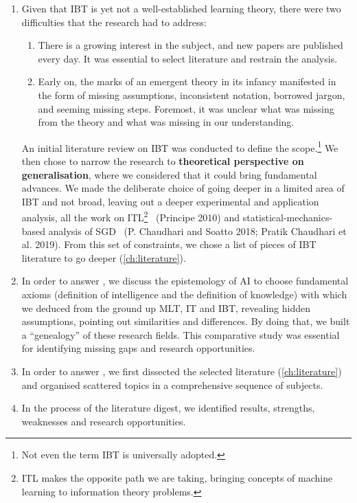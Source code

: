 \documentclass[
  letterpaper,
]{tufte-book}
\begin{document}
\begin{enumerate}
\def\labelenumi{\arabic{enumi}.}
\item
  Given that {IBT} is yet not a well-established learning theory, there
  were two difficulties that the research had to address:

  \begin{enumerate}
  \def\labelenumii{\arabic{enumii}.}
  \item
    There is a growing interest in the subject, and new papers are
    published every day. It was essential to select literature and
    restrain the analysis.
  \item
    Early on, the marks of an emergent theory in its infancy manifested
    in the form of missing assumptions, inconsistent notation, borrowed
    jargon, and seeming missing steps. Foremost, it was unclear what was
    missing from the theory and what was missing in our understanding.
  \end{enumerate}

  An initial literature review on {IBT} was conducted to define the
  scope.\footnote{Not even the term {IBT} is universally adopted.} We
  then chose to narrow the research to \textbf{theoretical perspective
  on generalisation}, where we considered that it could bring
  fundamental advances. We made the deliberate choice of going deeper in
  a limited area of {IBT} and not broad, leaving out a deeper
  experimental and application analysis, all the work on
  {ITL}\footnote{{ITL} makes the opposite path we are taking, bringing
    concepts of machine learning to information theory problems.}
  ~(Principe 2010) and statistical-mechanics-based analysis of SGD ~(P.
  Chaudhari and Soatto 2018; Pratik Chaudhari et al. 2019). From this
  set of constraints, we chose a list of pieces of {IBT} literature to
  go deeper (\protect\hyperlink{ch:literature}{{[}ch:literature{]}}).
\item
  In order to answer , we discuss the epistemology of {AI} to choose
  fundamental axioms (definition of intelligence and the definition of
  knowledge) with which we deduced from the ground up {MLT}, {IT} and
  {IBT}, revealing hidden assumptions, pointing out similarities and
  differences. By doing that, we built a ``genealogy'' of these research
  fields. This comparative study was essential for identifying missing
  gaps and research opportunities.
\item
  In order to answer , we first dissected the selected literature
  (\protect\hyperlink{ch:literature}{{[}ch:literature{]}}) and organised
  scattered topics in a comprehensive sequence of subjects.
\item
  In the process of the literature digest, we identified results,
  strengths, weaknesses and research opportunities.
\end{enumerate}
\end{document}
